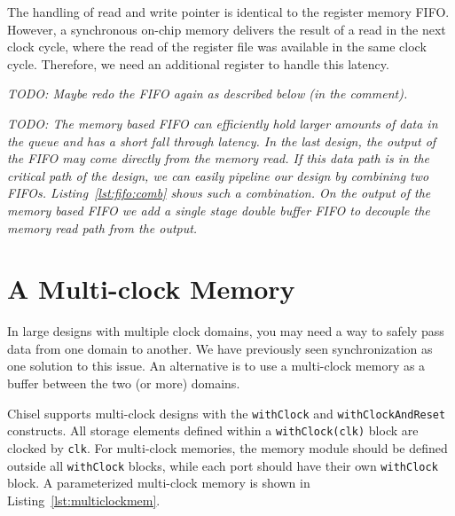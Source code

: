 \documentclass[%
    10pt,
    headinclude, footexclude,
    openright, %
    notitlepage,
    cleardoubleempty,
    headsepline,
    pointlessnumbers,
    bibtotoc, idxtotoc,
    ]{scrbook}
\newcommand{\code}[1]{{\small{\texttt{#1}}}}
\newcommand{\todo}[1]{{\emph{TODO: #1}}}
\begin{document}
The handling of read and write pointer is identical to the register memory
FIFO. However, a synchronous on-chip memory delivers the result of a read
in the next clock cycle, where the read of the register file was available in the
same clock cycle.
Therefore, we need an additional register to handle this latency.

\todo{Maybe redo the FIFO again as described below (in the comment).}

\todo{
The memory based FIFO can efficiently hold larger amounts of data in the queue
and has a short fall through latency. In the last design, the output of the FIFO may
come directly from the memory read. If this data path is in the critical path of the design,
we can easily pipeline our design by combining two FIFOs. Listing~\ref{lst:fifo:comb}
shows such a combination. On the output of the memory based FIFO we add a single
stage double buffer FIFO to decouple the memory read path from the output.}


\section{A Multi-clock Memory}

In large designs with multiple clock domains, you may need a way to safely
pass data from one domain to another. We have previously seen synchronization as
one solution to this issue. An alternative is to use a multi-clock memory as
a buffer between the two (or more) domains.


Chisel supports multi-clock designs with the \code{withClock} and
\code{withClockAndReset} constructs. All storage elements defined within a
\code{withClock(clk)} block are clocked by \code{clk}. For multi-clock memories,
the memory module should be defined outside all \code{withClock} blocks, while
each port should have their own \code{withClock} block. A parameterized
multi-clock memory is shown in Listing~\ref{lst:multiclockmem}.
\end{document}
